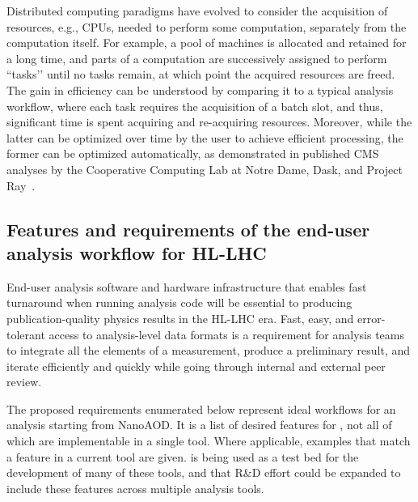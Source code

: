 Distributed computing paradigms have evolved to consider the acquisition of resources, e.g., \glspl{CPU}, needed to perform some computation, separately from the computation itself. For example, a pool of machines is allocated and retained for a long time, and parts of a computation are successively assigned to perform ``tasks’’ until no tasks remain, at which point the acquired resources are freed. The gain in efficiency can be understood by comparing it to a typical analysis workflow, where each task requires the acquisition of a batch slot, and thus, significant time is spent acquiring and re-acquiring resources. Moreover, while the latter can be optimized over time by the user to achieve efficient processing, the former can be optimized automatically, as demonstrated in published CMS analyses by the Cooperative Computing Lab at Notre Dame, Dask, and Project Ray~\cite{projectray}.

\subsection{Features and requirements of the end-user analysis workflow for HL-LHC}
\label{sec:idealworkflow}

End-user analysis software and hardware infrastructure that enables fast turnaround when running analysis code will be essential to producing publication-quality physics results in the \gls{HL-LHC} era. Fast, easy, and error-tolerant access to analysis-level data formats is a requirement for analysis teams to integrate all the elements of a measurement, produce a preliminary result, and iterate efficiently and quickly while going through internal and external peer review.

The proposed requirements enumerated below represent ideal workflows for an analysis starting from NanoAOD. It is a list of desired features for \PhaseTwo, not all of which are implementable in a single tool. Where applicable, examples that match a feature in a current tool are given. \RunThree is being used as a test bed for the development of many of these tools, and that R\&D effort could be expanded to include these features across multiple analysis tools.

